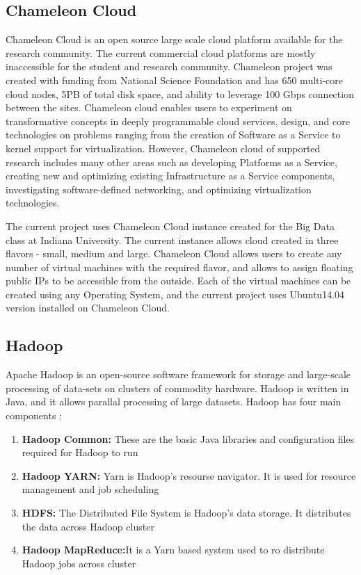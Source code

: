 \documentclass[9pt,twocolumn,twoside]{../../styles/osajnl}
\begin{document}
\subsection{Chameleon Cloud}
Chameleon Cloud is an open source large scale cloud platform available for the research community. The current commercial cloud platforms are mostly inaccessible for the student and research community. Chameleon project was created with funding from National Science Foundation and has 650 multi-core cloud nodes, 5PB of total disk space, and ability to leverage 100 Gbps connection between the sites. Chameleon cloud enables users to experiment on transformative concepts in deeply programmable cloud services, design, and core technologies on problems ranging from the creation of Software as a Service to kernel support for virtualization. However, Chameleon cloud  of supported research includes many other areas such as developing Platforms as a Service, creating new and optimizing existing Infrastructure as a Service components, investigating software-defined networking, and optimizing virtualization technologies. \cite{www-cham-cloud}

The current project uses Chameleon Cloud instance created for the Big Data class at Indiana University. The current instance allows cloud created in three flavors - small, medium and large. Chameleon Cloud allows users to create any number of virtual machines with the required flavor, and allows to assign floating public IPs to be accessible from the outside. Each of the virtual machines can be created using any Operating System, and the current project uses Ubuntu14.04 version installed on Chameleon Cloud.

\subsection{Hadoop}
Apache Hadoop is an open-source software framework for storage and large-scale processing of data-sets on clusters of commodity hardware. Hadoop is written in Java, and it allows parallal processing of large datasets. Hadoop has four main components \cite{www-had-tut-point}:

\begin{enumerate}
    \item \textbf{Hadoop Common:} These are the basic Java libraries and configuration files required for Hadoop to run
    \item \textbf{Hadoop YARN:} Yarn is Hadoop's resourse navigator. It is used for resource management and job scheduling
    \item \textbf{HDFS:} The Distributed File System is Hadoop's data storage. It distributes the data across Hadoop cluster
    \item \textbf{Hadoop MapReduce:}It is a Yarn based system used to ro distribute Hadoop jobs across cluster
    \end{enumerate}
\end{document}
